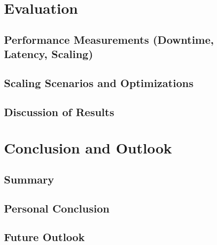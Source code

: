 \documentclass[11pt, a4paper, oneside, listof=totoc]{scrartcl}
\begin{document}
    \section{Evaluation}\label{sec:evaluation}

        \subsection[Performance Measurements]{Performance Measurements (Downtime, Latency, Scaling)}\label{subsec:performance}

        \subsection{Scaling Scenarios and Optimizations}\label{subsec:scalingOptimization}

        \subsection{Discussion of Results}\label{subsec:discussion}

    \section{Conclusion and Outlook}\label{sec:conclusion}

        \subsection{Summary}\label{subsec:summary}

        \subsection{Personal Conclusion}\label{subsec:personalConclusion}

        \subsection{Future Outlook}\label{subsec:outlook}

    \cleardoublepage{}
    \printbibliography[
        title = {References},
        heading = bibintoc
    ]

    \cleardoublepage{}
    \listoffigures

    \cleardoublepage{}

    \appendix
\end{document}
